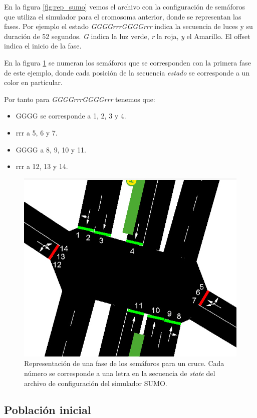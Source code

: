 En la figura \ref{fig:rep_sumo} vemos el archivo con la configuración de semáforos que utiliza el simulador para el cromosoma anterior, donde se representan las fases. Por ejemplo el estado \emph{GGGGrrrGGGGrrr} indica la secuencia de luces y su duración de 52 segundos. \emph{G} indica la luz verde, \emph{r} la roja, \emph{y} el Amarillo. El offset indica el inicio de la fase. 

En la figura \ref{fig:sem_numerados} se numeran los semáforos que se corresponden con la primera fase de este ejemplo, donde cada posición de la secuencia \emph{estado} se corresponde a un color en particular. 


Por tanto para \emph{GGGGrrrGGGGrrr} tenemos que:
\begin{itemize}
\item GGGG se corresponde a 1, 2, 3 y 4. 
\item rrr a 5, 6 y 7. 
\item GGGG a 8, 9, 10 y 11. 
\item rrr a 12, 13 y 14. 
\end{itemize}
  




\begin{figure}[H]
	\centering
	\includegraphics[width=0.7\linewidth]{Figures/semaforos_numerado}
	\caption{Representación de una fase de los semáforos para un cruce. Cada número se corresponde a una letra en la secuencia de \emph{state} del archivo de configuración del simulador SUMO.}
	\label{fig:sem_numerados}
\end{figure}

\subsection{Población inicial}

